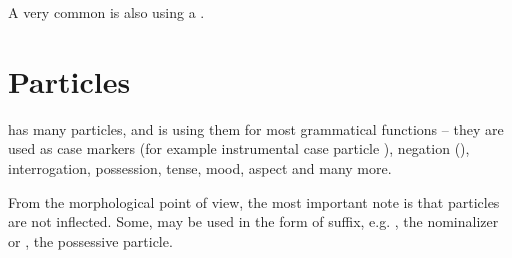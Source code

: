 A very common is also using a .


\section{Particles}
\label{sec:morph-parts}

\andro has many particles, and is using them for most grammatical functions --
they are used as case markers (for example instrumental case particle
), negation (), interrogation, possession, tense, mood,
aspect and many more.

From the morphological point of view, the most important note is that particles
are not inflected. Some, may be used in the form of suffix, e.g. ,
the nominalizer or , the possessive particle.
